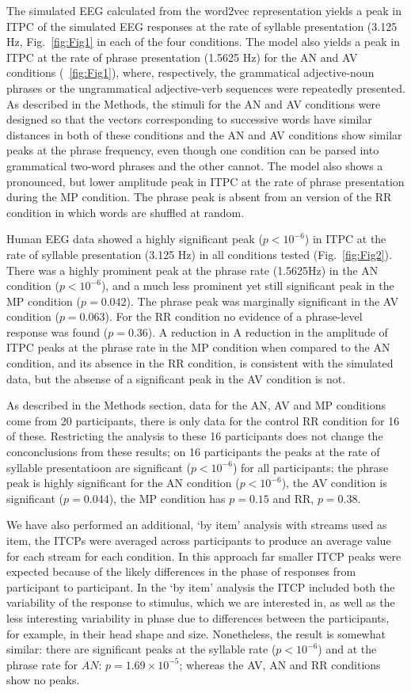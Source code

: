 \documentclass[10pt,letterpaper]{article}
\begin{document}
The simulated EEG calculated from the word2vec representation yields a
peak in ITPC of the simulated EEG responses at the rate of syllable
presentation (3.125 Hz, Fig.~\ref{fig:Fig1} in each of the four
conditions. The model also yields a peak in ITPC at the rate of phrase
presentation (1.5625 Hz) for the AN and AV conditions
(~\ref{fig:Fig1}), where, respectively, the grammatical adjective-noun
phrases or the ungrammatical adjective-verb sequences were repeatedly
presented. As described in the Methods, the stimuli for the AN and AV
conditions were designed so that the vectors corresponding to
successive words have similar distances in both of these conditions
and the AN and AV conditions show similar peaks at the phrase
frequency, even though one condition can be parsed into grammatical
two-word phrases and the other cannot. The model also shows a
pronounced, but lower amplitude peak in ITPC at the rate of phrase
presentation during the MP condition. The phrase peak is absent from
an version of the RR condition in which words are shuffled at random.

Human EEG data showed a highly significant peak ($p<10^{-6}$) in ITPC
at the rate of syllable presentation (3.125 Hz) in all conditions
tested (Fig.~\ref{fig:Fig2}). There was a highly prominent peak at the
phrase rate (1.5625Hz) in the AN condition ($p<10^{-6}$), and a much
less prominent yet still significant peak in the MP condition
($p=0.042$). The phrase peak was marginally significant in the AV
condition ($p=0.063$). For the RR condition no evidence of a
phrase-level response was found ($p=0.36$). A reduction in A reduction
in the amplitude of ITPC peaks at the phrase rate in the MP condition
when compared to the AN condition, and its absence in the RR
condition, is consistent with the simulated data, but the absense of a
significant peak in the AV condition is not.

As described in the Methods section, data for the AN, AV and MP
conditions come from 20 participants, there is only data for the
control RR condition for 16 of these. Restricting the analysis to
these 16 participants does not change the conconclusions from these
results; on 16 participants the peaks at the rate of syllable
presentatioon are significant ($p<10^{-6}$) for all participants; the
phrase peak is highly significant for the AN condition ($p<10^{-6}$),
the AV condition is significant ($p=0.044$), the MP condition has
$p=0.15$ and RR, $p=0.38$.

We have also performed an additional, `by item' analysis with streams
used as item, the ITCPs were averaged across participants to produce
an average value for each stream for each condition. In this approach
far smaller ITCP peaks were expected because of the likely differences
in the phase of responses from participant to participant. In the `by
item' analysis the ITCP included both the variability of the response
to stimulus, which we are interested in, as well as the less
interesting variability in phase due to differences between the
participants, for example, in their head shape and size. Nonetheless,
the result is somewhat similar: there are significant peaks at the
syllable rate ($p<10^{-6}$) and at the phrase rate for $AN$:
$p=1.69\times 10^{-5}$; whereas the AV, AN and RR conditions show no
peaks.
\end{document}
